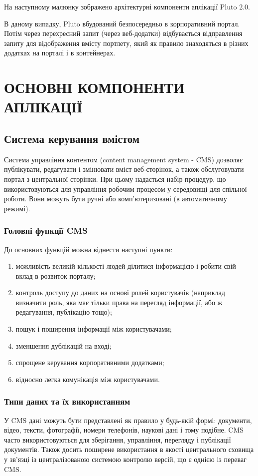 На наступному малюнку зображено архітектурні компоненти аплікації Pluto 2.0. 
\par В даному випадку, Pluto вбудований безпосередньо в корпоративний портал. 
Потім через перехресний запит (через веб-додатки) відбувається відправлення запиту для відображення вмісту портлету, який як правило знаходяться в різних додатках на порталі і в контейнерах. 

\section{ОСНОВНІ КОМПОНЕНТИ АПЛІКАЦІЇ}

\subsection{Система керування вмістом}
Система управління контентом (content management system - CMS) дозволяє публікувати, редагувати і змінювати вміст веб-сторінок, а також обслуговувати портал з центральної сторінки. 
При цьому надається набір процедур, що використовуються для управління робочим процесом у середовищі для спільної роботи.
Вони можуть бути ручні або комп'ютеризовані (в автоматичному режимі).
\subsubsection{Головні функції CMS}
До основних функцій можна віднести наступні пункти:
\begin{enumerate}
\item можливість великій кількості людей ділитися інформацією і робити свій вклад в розвиток порталу;
\item контроль доступу до даних на основі ролей користувачів (наприклад визначити роль, яка має тільки права на перегляд інформації, або ж редагування, публікацію тощо);
\item пошук і поширення інформації між користувачами;
\item зменшення дублікацій на вході;
\item спрощене керування корпоративними додатками;
\item відносно легка комунікація між користувачами.
\end{enumerate}

\subsubsection{Типи даних та їх використанням}
У CMS дані можуть бути представлені як правило у будь-якій формі: документи, відео, тексти, фотографії, номери телефонів, наукові дані і тому подібне. 
CMS часто використовуються для зберігання, управління, перегляду і публікації документів. 
Також досить поширене використання в якості центрального сховища у зв'язці із централізованою системою контролю версій, що є однією із переваг CMS.
